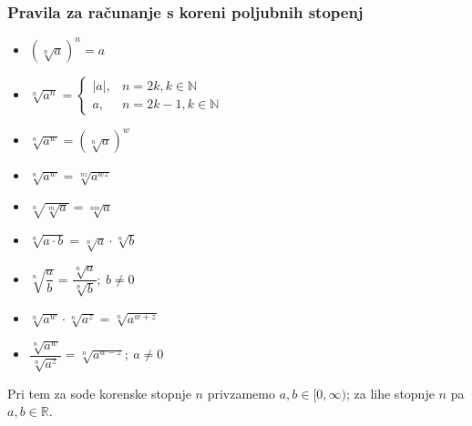         

         
                        
            \subsubsection*{Pravila za računanje s koreni poljubnih stopenj}
                
                    \begin{itemize}
                        \item $\displaystyle \left(\sqrt[n]{a}\right)^n=a$ 
                        \item $\displaystyle \sqrt[n]{a^n}=\begin{cases}
                                \lvert a\rvert, & n=2k, k\in\mathbb{N} \\
                                a, & n=2k-1, k\in\mathbb{N}
                            \end{cases}$ ~
                        \item $\displaystyle \sqrt[n]{a^w}=\left(\sqrt[n]{a}\right)^w$ 
                        \item $\displaystyle \sqrt[n]{a^w}=\sqrt[nz]{a^{wz}}$ 
                        \item $\displaystyle \sqrt[n]{\sqrt[m]{a}}=\sqrt[nm]{a}$ 
                        \item $\displaystyle \sqrt[n]{a\cdot b}=\sqrt[n]{a}\cdot\sqrt[n]{b}$ 
                        \item $\displaystyle \sqrt[n]{\dfrac{a}{b}}=\dfrac{\sqrt[n]{a}}{\sqrt[n]{b}}; ~b\neq 0$ 
                        \item $\displaystyle \sqrt[n]{a^w}\cdot\sqrt[n]{a^z}=\sqrt[n]{a^{w+z}}$ 
                        \item $\displaystyle \dfrac{\sqrt[n]{a^w}}{\sqrt[n]{a^z}}=\sqrt[n]{a^{w-z}}; ~a\neq 0$
                    \end{itemize}
                
                

                Pri tem za sode korenske stopnje $n$ privzamemo $a,b\in[0,\infty)$; za lihe stopnje $n$ pa $a,b\in\mathbb{R}$.
            

        



